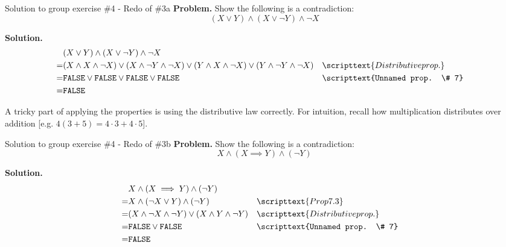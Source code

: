 \documentclass[10pt]{beamer}
\begin{document}
\begin{frame}{Solution to group exercise \#4 - Redo of  \#3a}
\footnotesize 
\textbf{Problem.} Show the following is a contradiction:
\[ (X \lor Y) \land (X \lor \lnot Y) \land \lnot X \]

\vfill 
\textbf{Solution.}
\begin{align*}
& (X \lor Y) \land (X \lor \lnot Y) \land \lnot X \\
=& (X \land X \land \lnot X) \lor (X \land \lnot Y \land \lnot X) \lor (Y \land X \land \lnot X) \lor (Y \land \lnot Y \land \lnot X) && \scripttext{Distributive prop.} \\
=& \texttt{FALSE} \lor \texttt{FALSE} \lor  \texttt{FALSE} \lor  \texttt{FALSE}  && \scripttext{Unnamed prop. \# 7} \\
=& \texttt{FALSE}
\end{align*}
\vfill 
\vfill
\begin{myredbox}[title=Remark]
A tricky part of applying the properties is using the distributive law correctly.  For intuition, recall how multiplication distributes over addition [e.g. $4(3+5) = 4 \cdot 3 + 4 \cdot 5$]. 
\end{myredbox}

\end{frame}

\begin{frame}{Solution to group exercise \#4 - Redo of  \#3b}
\footnotesize 
\textbf{Problem.} Show the following is a contradiction:
\[ X \land (X \implies Y) \land (\lnot Y) \]

\vfill 
\textbf{Solution.}
\begin{align*}
& X \land (X \implies Y) \land (\lnot Y) \\
=& 	 X \land (\lnot X \lor Y) \land (\lnot Y) && \scripttext{Prop 7.3} \\
=& (X \land \lnot X \land \lnot Y) \lor (X \land Y \land \lnot Y) && \scripttext{Distributive prop.} \\
=& \texttt{FALSE} \lor \texttt{FALSE} && \scripttext{Unnamed prop. \# 7} \\
=& \texttt{FALSE}
\end{align*}
\end{frame}
\end{document}
